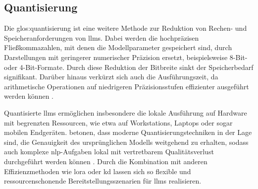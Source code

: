 
\subsection{Quantisierung}

Die \gls{glos:quantisierung} ist eine weitere Methode zur Reduktion von Rechen- und Speicheranforderungen von \glspl{llm}.
Dabei werden die hochpräzisen Fließkommazahlen, mit denen die Modellparameter gespeichert sind, durch Darstellungen mit geringerer numerischer Präzision ersetzt, beispielsweise 8-Bit- oder 4-Bit-Formate.
Durch diese Reduktion der Bitbreite sinkt der Speicherbedarf signifikant.
Darüber hinaus verkürzt sich auch die Ausführungszeit, da arithmetische Operationen auf niedrigeren Präzisionsstufen effizienter ausgeführt werden können \autocite{egashira_exploiting_2024}.

Quantisierte \glspl{llm} ermöglichen insbesondere die lokale Ausführung auf Hardware mit begrenzten Ressourcen, wie etwa auf Workstations, Laptops oder sogar mobilen Endgeräten.
\citeauthor{egashira_exploiting_2024} betonen, dass moderne Quantisierungstechniken in der Lage sind, die Genauigkeit des ursprünglichen Modells weitgehend zu erhalten, sodass auch komplexe \gls{nlp}-Aufgaben lokal mit vertretbarem Qualitätsverlust durchgeführt werden können \autocite{egashira_exploiting_2024}.
Durch die Kombination mit anderen Effizienzmethoden wie \gls{lora} oder \gls{kd} lassen sich so flexible und ressourcenschonende Bereitstellungsszenarien für \glspl{llm} realisieren.


